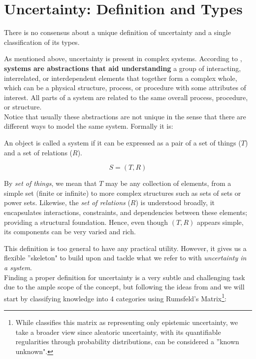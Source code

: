\section{Uncertainty: Definition and Types}

There is no consensus about a unique definition of uncertainty and a single classification of its types. 

As mentioned above, uncertainty is present in complex systems. According to \cite{UncertaintySciences}, \textbf{systems are abstractions that aid understanding} a group of interacting, interrelated, or interdependent elements that together form a complex whole, which can be a physical structure, process, or procedure with some attributes of interest. All parts of a system are related to the same overall process, procedure, or structure. \\

Notice that usually these abstractions are not unique in the sense that there are different ways to model the same system. Formally it is:

\begin{definition}[System]
    An object is called a system if it can be expressed as a pair of a set of things ($T$) and a set of relations ($R$).

    \[S = (T,R)\]
\end{definition}

\begin{remark}
    By \emph{set of things}, we mean that \(T\) may be any collection of elements, from a simple set (finite or infinite) to more complex structures such as sets of sets or power sets. Likewise, the \emph{set of relations} (\(R\)) is understood broadly, it encapsulates interactions, constraints, and dependencies between these elements; providing a structural foundation. Hence, even though \((T, R)\) appears simple, its components can be very varied and rich.
\end{remark}

This definition is too general to have any practical utility. However, it gives us a flexible ''skeleton" to build upon and tackle what we refer to with \textit{uncertainty in a system}. \\

Finding a proper definition for uncertainty is a very subtle and challenging task due to the ample scope of the concept, but following the ideas from \cite{UncertaintySciences} and \cite{RumsfeldMatrix} we will start by classifying knowledge into 4 categories using Rumsfeld's Matrix\footnote{While \cite{RumsfeldMatrix} classifies this matrix as representing only epistemic uncertainty, we take a broader view since aleatoric uncertainty, with its quantifiable regularities through probability distributions, can be considered a ''known unknown".}:

